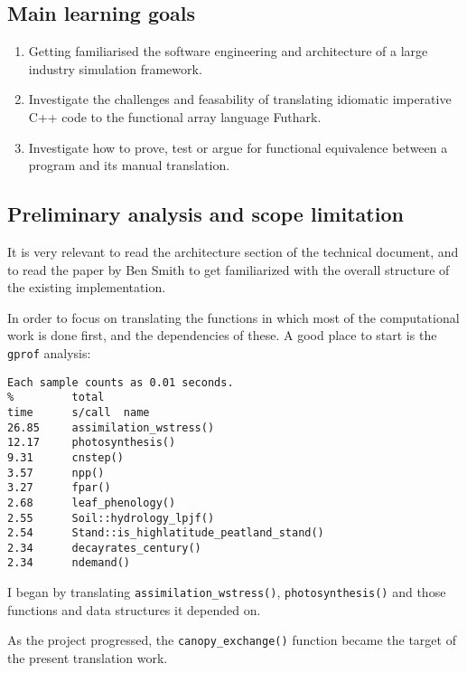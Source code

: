 \subsection{Main learning goals}
\begin{enumerate}
\item Getting familiarised the software engineering and architecture of a large industry simulation framework.
\item Investigate the challenges and feasability of translating idiomatic imperative C++ code to the functional array language Futhark.
\item Investigate how to prove, test or argue for functional equivalence between a program and its manual translation.
\end{enumerate}

\subsection{Preliminary analysis and scope limitation}
It is very relevant to read the architecture section of the technical document, and to read the paper\cite{smith2001lpj} by Ben Smith to get familiarized with the overall structure of the existing implementation.

In order to focus on translating the functions in which most of the computational work is done first, and the dependencies of these. A good place to start is the \texttt{gprof} analysis:
\begin{verbatim}
Each sample counts as 0.01 seconds.
%         total
time      s/call  name
26.85     assimilation_wstress()
12.17     photosynthesis()
9.31      cnstep()
3.57      npp()
3.27      fpar()
2.68      leaf_phenology()
2.55      Soil::hydrology_lpjf()
2.54      Stand::is_highlatitude_peatland_stand()
2.34      decayrates_century()
2.34      ndemand()
\end{verbatim}
I began by translating \texttt{assimilation_wstress()}, \texttt{photosynthesis()} and those functions and data structures it depended on.

As the project progressed, the \texttt{canopy_exchange()} function became the target of the present translation work.
